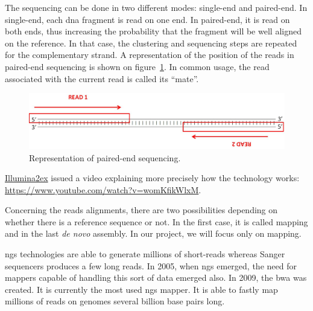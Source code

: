 The sequencing can be done in two different modes: single-end and paired-end.
In single-end, each \gls{dna} fragment is read on one end.
In paired-end, it is read on both ends, thus increasing the probability that the fragment will be well aligned on the reference.
In that case, the clustering and sequencing steps are repeated for the complementary strand.
A representation of the position of the reads in paired-end sequencing is shown on figure~\ref{fig:pairedEndSeq}.
In common usage, the read associated with the current read is called its ``mate''.

\begin{figure}[h]
    \includegraphics[width=\textwidth]{img/pairedEnd}
    \caption{Representation of paired-end sequencing.}
    \label{fig:pairedEndSeq}
\end{figure}

\href{http://www.illumina.com/}{Illumina\ttfamily\tiny\raise 2ex\hbox{\textregistered}} issued a video explaining more precisely how the technology works:\\
\url{https://www.youtube.com/watch?v=womKfikWlxM}.

Concerning the reads alignments, there are two possibilities depending on whether there is a reference sequence or not.
In the first case, it is called mapping and in the last \emph{de novo} assembly.
In our project, we will focus only on mapping.

\gls{ngs} technologies are able to generate millions of short-reads whereas Sanger sequencers produces a few long reads.
In 2005, when \gls{ngs} emerged, the need for mappers capable of handling this sort of data emerged also.
In 2009, the \gls{bwa} was created. It is currently the most used \gls{ngs} mapper.
It is able to fastly map millions of reads on genomes several billion base pairs long.


